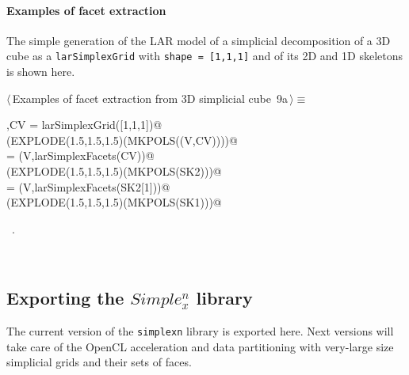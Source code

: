 \documentclass[11pt,oneside]{article}	%
\begin{document}
\paragraph{Examples of facet extraction}
The simple generation of the LAR model of a simplicial decomposition of a 3D cube as a \texttt{larSimplexGrid} with \texttt{shape = [1,1,1]} and of its 2D and 1D skeletons is shown here.

\begin{flushleft} \small
\begin{minipage}{\linewidth} \label{scrap9}
\protect{}$\langle\,$Examples of facet extraction from 3D simplicial cube\nobreak\ {\footnotesize 9a}$\,\rangle\equiv$
\vspace{-1ex}
\begin{list}{}{} \item
\mbox{}\verb@V,CV = larSimplexGrid([1,1,1])@\\
\mbox{}\verb@VIEW(EXPLODE(1.5,1.5,1.5)(MKPOLS((V,CV))))@\\
\mbox{} = (V,larSimplexFacets(CV))@\\
\mbox{}\verb@VIEW(EXPLODE(1.5,1.5,1.5)(MKPOLS(SK2)))@\\
\mbox{} = (V,larSimplexFacets(SK2[1]))@\\
\mbox{}\verb@VIEW(EXPLODE(1.5,1.5,1.5)(MKPOLS(SK1)))@\\
\mbox{}\verb@@{\NWsep}
\end{list}
\vspace{-1ex}
\footnotesize\addtolength{\baselineskip}{-1ex}
\begin{list}{}{\setlength{\itemsep}{-\parsep}\setlength{\itemindent}{-\leftmargin}}
\item \NWtxtMacroRefIn\ .
\end{list}
\end{minipage}\\[4ex]
\end{flushleft}



\subsection{Exporting the $Simple_x^n$ library}
The current version of the \texttt{simplexn} library is exported here. Next versions will take care of the OpenCL acceleration and data partitioning with very-large size simplicial grids and their sets of faces.
\end{document}
